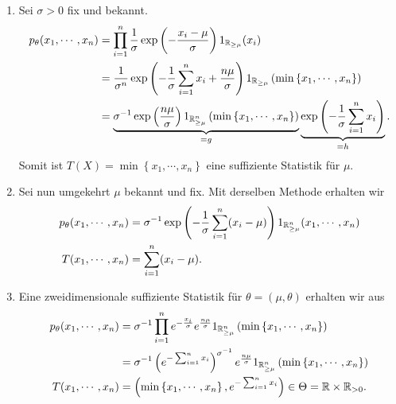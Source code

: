 \solution
\begin{enumerate}
    \item Sei $\sigma>0$ fix und bekannt. 
        \begin{align*}
            p_\theta (x_1, \cdots, x_n) &= \prod_{i=1}^{n} 
            \frac{1}{\sigma} \exp \left(-\frac{x_i-\mu}{\sigma} \right) 1_{\mathbb R_{\geq\mu}}(x_i) \\
            &= \frac{1}{\sigma^n} \exp \left( -\frac{1}{\sigma} \sum_{i=1}^{n} x_i + \frac{n\mu}{\sigma} \right)
            1_{\mathbb R_{\geq \mu}}\left( \min \left\{ x_1, \cdots, x_n \right\} \right)  \\
            &= \underbrace{
            \sigma^{-1} \exp \left( \frac{n\mu}{\sigma} \right) 
            1_{\mathbb R^n_{\geq \mu}}\left( \min \left\{ x_1, \cdots, x_n \right\} \right) }_{=g}
            \underbrace{\exp \left( -\frac{1}{\sigma} \sum_{i=1}^{n} x_i  \right) }_{=h}.
        \end{align*}
        Somit ist $T(X) = \min \left\{ x_1, \cdots, x_n \right\}$ eine suffiziente Statistik für $\mu$. 
    \item Sei nun umgekehrt $\mu$ bekannt und fix. Mit derselben Methode erhalten wir
        \begin{align*}
            p_\theta (x_1, \cdots, x_n) &= \sigma^{-1} 
            \exp \left( - \frac{1}{\sigma} \sum_{i=1}^{n} (x_i - \mu) \right) 1_{\mathbb R^{n}_{\geq \mu}} (x_1, \cdots, x_n) \\
            T(  x_1, \cdots, x_n) &= \sum_{i=1}^{n} (x_i - \mu). 
        \end{align*}
    \item Eine zweidimensionale suffiziente Statistik für $\theta = (\mu, \theta)$ erhalten wir aus
        \begin{align*}
            p_\theta(x_1, \cdots, x_n) &= \sigma^{-1} \prod_{i=1}^n e^{ -\frac{x_i}{\sigma}} e^{\frac{n\mu}{\sigma}}
            1_{\mathbb R^n_{\geq \mu}}\left( \min \left\{ x_1, \cdots, x_n \right\} \right) \\
            &= \sigma^{-1} \left( e^{- \sum_{i=1}^{n} x_i} \right)^{\sigma^{-1}} 
            e^{\frac{n\mu}{\sigma}}
            1_{\mathbb R^n_{\geq \mu}}\left( \min \left\{ x_1, \cdots, x_n \right\} \right) \\
            T( x_1, \cdots, x_n ) &= \left( \min \left\{ x_1, \cdots, x_n \right\}, 
            e^{-\sum_{i=1}^{n} x_i} \right) \in \Theta = \mathbb R \times \mathbb R_{>0}. 
        \end{align*}
\end{enumerate}



